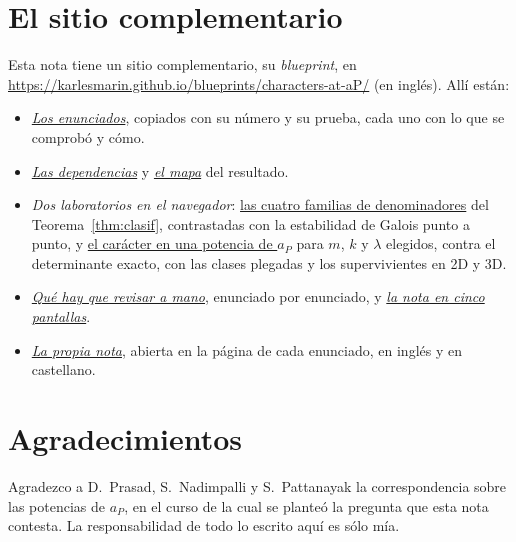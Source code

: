 \documentclass[11pt,a4paper]{article}
\begin{document}
\section*{El sitio complementario}
Esta nota tiene un sitio complementario, su \emph{blueprint}, en \url{https://karlesmarin.github.io/blueprints/characters-at-aP/} (en inglés). Allí están:
\begin{itemize}
\item \href{https://karlesmarin.github.io/blueprints/characters-at-aP/index.html\#thm:crit}{\emph{Los enunciados}}, copiados con su número y su prueba, cada uno con lo que se comprobó y cómo.
\item \href{https://karlesmarin.github.io/blueprints/characters-at-aP/dep_graph_document.html}{\emph{Las dependencias}} y \href{https://karlesmarin.github.io/blueprints/characters-at-aP/mapa.html}{\emph{el mapa}} del resultado.
\item \emph{Dos laboratorios en el navegador}: \href{https://karlesmarin.github.io/blueprints/characters-at-aP/index.html?lab=thm\%3Aclasif\#thm:clasif}{las cuatro familias de denominadores} del Teorema~\ref{thm:clasif}, contrastadas con la estabilidad de Galois punto a punto, y \href{https://karlesmarin.github.io/blueprints/characters-at-aP/index.html?lab=thm\%3Asigno\#thm:signo}{el carácter en una potencia de $a_P$} para $m$, $k$ y $\lambda$ elegidos, contra el determinante exacto, con las clases plegadas y los supervivientes en 2D y 3D.
\item \href{https://karlesmarin.github.io/blueprints/characters-at-aP/referee.html}{\emph{Qué hay que revisar a mano}}, enunciado por enunciado, y \href{https://karlesmarin.github.io/blueprints/characters-at-aP/tour.html}{\emph{la nota en cinco pantallas}}.
\item \href{https://karlesmarin.github.io/blueprints/characters-at-aP/pdf.html}{\emph{La propia nota}}, abierta en la página de cada enunciado, en inglés y en castellano.
\end{itemize}

\section*{Agradecimientos}

\noindent Agradezco a D.~Prasad, S.~Nadimpalli y S.~Pattanayak la correspondencia sobre las potencias
de $a_P$, en el curso de la cual se planteó la pregunta que esta nota contesta. La responsabilidad de todo lo
escrito aquí es sólo mía.
\end{document}

